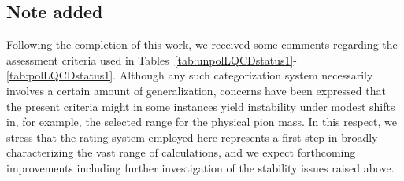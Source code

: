 \subsection*{Note added}

Following the completion of this work, we received some comments regarding the 
assessment criteria used in 
Tables~\ref{tab:unpolLQCDstatus1}-\ref{tab:polLQCDstatus1}. 
%
Although any such categorization system necessarily involves a certain amount 
of generalization, concerns have been expressed that the present criteria 
might in some instances yield instability under modest shifts in, for example, 
the selected range for the physical pion mass. 
%
In this respect, we stress that the rating system employed here represents a 
first step in broadly characterizing the vast range of calculations, and we 
expect forthcoming improvements including further investigation of the 
stability issues raised above.
